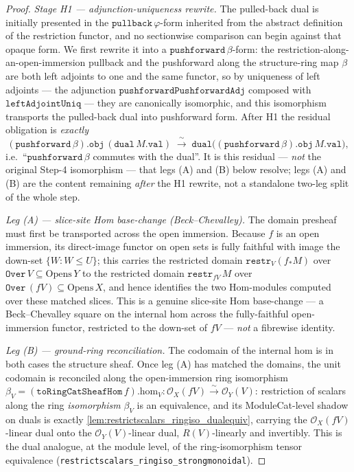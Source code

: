 \begin{proof}
  \emph{Stage H1 --- adjunction-uniqueness rewrite.} The pulled-back dual is initially
  presented in the \(\mathtt{pullback}\,\varphi\)-form inherited from the abstract
  definition of the restriction functor, and no sectionwise comparison can begin against
  that opaque form. We first rewrite it into a \(\mathtt{pushforward}\,\beta\)-form: the
  restriction-along-an-open-immersion pullback and the pushforward along the structure-ring
  map \(\beta\) are both left adjoints to one and the same functor, so by uniqueness of left
  adjoints --- the adjunction \(\mathtt{pushforwardPushforwardAdj}\) composed with
  \(\mathtt{leftAdjointUniq}\) --- they are canonically isomorphic, and this isomorphism
  transports the pulled-back dual into pushforward form. After H1 the residual obligation is
  \emph{exactly}
  \[
    (\mathtt{pushforward}\,\beta).\mathtt{obj}\,(\mathtt{dual}\,M.\mathtt{val})
      \;\xrightarrow{\ \sim\ }\;
    \mathtt{dual}\bigl((\mathtt{pushforward}\,\beta).\mathtt{obj}\,M.\mathtt{val}\bigr),
  \]
  i.e.\ ``\(\mathtt{pushforward}\,\beta\) commutes with the dual''. It is this residual ---
  \emph{not} the original Step-4 isomorphism --- that legs (A) and (B) below resolve; legs
  (A) and (B) are the content remaining \emph{after} the H1 rewrite, not a standalone
  two-leg split of the whole step.

  \emph{Leg (A) --- slice-site Hom base-change (Beck--Chevalley).} The domain presheaf must
  first be transported across the open immersion. Because \(f\) is an open immersion, its
  direct-image functor on open sets is fully faithful with image
  the down-set \(\{W : W \le U\}\); this carries the restricted domain
  \(\mathtt{restr}_V(f_*M)\) over \(\mathtt{Over}\,V \subseteq \mathrm{Opens}\,Y\) to the
  restricted domain \(\mathtt{restr}_{fV}\,M\) over \(\mathtt{Over}\,(fV) \subseteq
  \mathrm{Opens}\,X\), and hence identifies the two Hom-modules computed over these matched
  slices. This is a genuine slice-site Hom base-change --- a Beck--Chevalley square on the
  internal hom across the fully-faithful open-immersion functor, restricted to the down-set
  of \(fV\) --- \emph{not} a fibrewise identity.

  \emph{Leg (B) --- ground-ring reconciliation.} The codomain of the internal hom is in
  both cases the structure sheaf. Once leg (A) has matched the domains, the unit codomain
  is reconciled along the open-immersion ring isomorphism
  \(\beta_V = (\mathtt{toRingCatSheafHom}\,f).\mathrm{hom}_V \colon
  \mathcal{O}_X(fV) \xrightarrow{\sim} \mathcal{O}_Y(V)\): restriction of scalars along the
  ring \emph{isomorphism} \(\beta_V\) is an equivalence, and its ModuleCat-level
  shadow on duals is exactly \cref{lem:restrictscalars_ringiso_dualequiv}, carrying the
  \(\mathcal{O}_X(fV)\)-linear dual onto the \(\mathcal{O}_Y(V)\)-linear dual,
  \(R(V)\)-linearly and invertibly. This is the dual analogue, at the module level, of the
  ring-isomorphism tensor equivalence (\texttt{restrictscalars\_ringiso\_strongmonoidal}).


\end{proof}
